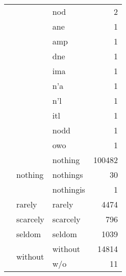 \begin{longtable}[ht]{lllr}
 &  & nod & {\cellcolor[HTML]{FFFFD9}} \color[HTML]{000000} 2 \\
 &  & ane & {\cellcolor[HTML]{FFFFD9}} \color[HTML]{000000} 1 \\
 &  & amp & {\cellcolor[HTML]{FFFFD9}} \color[HTML]{000000} 1 \\
 &  & dne & {\cellcolor[HTML]{FFFFD9}} \color[HTML]{000000} 1 \\
 &  & ima & {\cellcolor[HTML]{FFFFD9}} \color[HTML]{000000} 1 \\
 &  & n'a & {\cellcolor[HTML]{FFFFD9}} \color[HTML]{000000} 1 \\
 &  & n'l & {\cellcolor[HTML]{FFFFD9}} \color[HTML]{000000} 1 \\
 &  & itl & {\cellcolor[HTML]{FFFFD9}} \color[HTML]{000000} 1 \\
 &  & nodd & {\cellcolor[HTML]{FFFFD9}} \color[HTML]{000000} 1 \\
 &  & owo & {\cellcolor[HTML]{FFFFD9}} \color[HTML]{000000} 1 \\
\cline{2-4}
 & \multirow[c]{3}{*}{nothing} & nothing & {\cellcolor[HTML]{F8FCCA}} \color[HTML]{000000} 100482 \\
 &  & nothings & {\cellcolor[HTML]{FFFFD9}} \color[HTML]{000000} 30 \\
 &  & nothingis & {\cellcolor[HTML]{FFFFD9}} \color[HTML]{000000} 1 \\
\cline{2-4}
 & rarely & rarely & {\cellcolor[HTML]{FFFFD9}} \color[HTML]{000000} 4474 \\
\cline{2-4}
 & scarcely & scarcely & {\cellcolor[HTML]{FFFFD9}} \color[HTML]{000000} 796 \\
\cline{2-4}
 & seldom & seldom & {\cellcolor[HTML]{FFFFD9}} \color[HTML]{000000} 1039 \\
\cline{2-4}
 & \multirow[c]{2}{*}{without} & without & {\cellcolor[HTML]{FEFFD8}} \color[HTML]{000000} 14814 \\
 &  & w/o & {\cellcolor[HTML]{FFFFD9}} \color[HTML]{000000} 11 \\
\cline{1-4} \cline{2-4}
\end{longtable}

